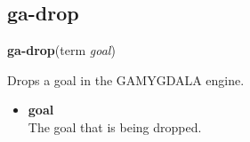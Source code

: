 \subsection{ga-drop}

\textbf{ga-drop}(term \emph{goal})

Drops a goal in the GAMYGDALA engine.

\begin{itemize}
	\item \textbf{goal} \\ The goal that is being dropped.
\end{itemize}


